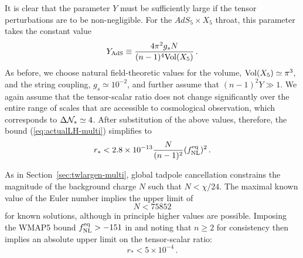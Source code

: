 It is clear that the parameter $Y$ 
must be sufficiently large if the tensor perturbations 
are to be non-negligible. For the $AdS_5 \times X_5$ throat, this parameter  
takes the constant value    
% 
\begin{equation}
\label{eq:YAds-multi}
Y_{\mathrm{AdS}} \equiv \frac{4\pi^2 g_s N}{(n-1)^4 \mathrm{Vol} (X_5)} \,.
\end{equation}
% 
As before, we choose natural field-theoretic values for the volume, 
$\mathrm{Vol} (X_5) \simeq \pi^3$, and the string coupling, 
$g_s \simeq 10^{-2}$, and further assume that 
$(n-1)^2 Y \gg 1$. 
We again assume that the tensor-scalar ratio does not change significantly
over the entire range of scales that are accessible to cosmological
observation, which corresponds to $\Delta \mathcal{N}_* \simeq 4$. 
After substitution of the above values, therefore, 
the bound (\ref{eq:actualLH-multi}) simplifies to
%  
\begin{equation}
\label{eq:AdSupper-multi}
r_* < 2.8 \times 10^{-13} \frac{N}{(n-1)^2} (f_{\mathrm{NL}}^{\mathrm{eq}})^2 \,.
\end{equation}
% 

As in Section~\ref{sec:twlargen-multi},
global tadpole cancellation constrains the magnitude of
the background charge $N$ such that $N < \chi /
24$. 
The maximal known value of the Euler number implies the upper limit of 
% 
\begin{equation}
\label{eq:Nlimit-multi} 
N < 75852
\end{equation}
% 
for known solutions, although in principle higher values are possible. 
Imposing the WMAP5 bound $f_{\mathrm{NL}}^{\mathrm{eq}}>-151$ in 
and noting that $n \ge 2$ for consistency then implies an absolute
upper limit 
on the tensor-scalar ratio:
%  
\begin{equation}
\label{eq:rupper-multi}
r_* < 5 \times 10^{-4} \, .
\end{equation}
% 


